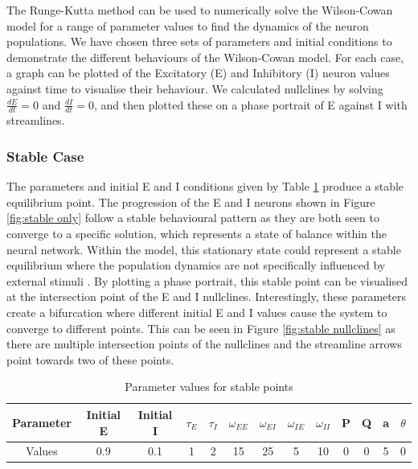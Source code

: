\documentclass[10pt]{article}
\begin{document}
The Runge-Kutta method can be used to numerically solve the Wilson-Cowan model for a range of parameter values to find the dynamics of the neuron populations. We have chosen three sets of parameters and initial conditions to demonstrate the different behaviours of the Wilson-Cowan model. For each case, a graph can be plotted of the Excitatory (E) and Inhibitory (I) neuron values against time to visualise their behaviour. We calculated nullclines by solving $\frac{dE}{dt}=0$ and $\frac{dI}{dt}=0$, and then plotted these on a phase portrait of E against I with streamlines.

\subsubsection*{Stable Case}

The parameters and initial E and I conditions given by Table \ref{bif} produce a stable equilibrium point. The progression of the E and I neurons shown in Figure \ref{fig:stable only} follow a stable behavioural pattern as they are both seen to converge to a specific solution, which represents a state of balance within the neural network. Within the model, this stationary state could represent a stable equilibrium where the population dynamics are not specifically influenced by external stimuli \cite{wiki}. By plotting a phase portrait, this stable point can be visualised at the intersection point of the E and I nullclines. Interestingly, these parameters create a bifurcation where different initial E and I values cause the system to converge to different points. This can be seen in Figure \ref{fig:stable nullclines} as there are multiple intersection points of the nullclines and the streamline arrows point towards two of these points.

\begin{table}[h] 
    \centering
    \begin{tabular}{|c|c|c|c|c|c|c|c|c|c|c|c|c|}
    \hline
    Parameter & Initial E & Initial I & $\tau_E$  & $\tau_I$ & $\omega_{EE}$ & $\omega_{EI}$ & $\omega_{IE}$ & $\omega_{II}$ & P & Q & a & $\theta$ \\
    \hline 
    Values & 0.9 & 0.1 & 1 & 2 & 15 & 25 & 5 & 10 & 0 & 0 & 5 & 0 \\
    \hline
     \end{tabular}
     \caption{Parameter values for stable points}
     \label{bif}
\end{table}
\end{document}

